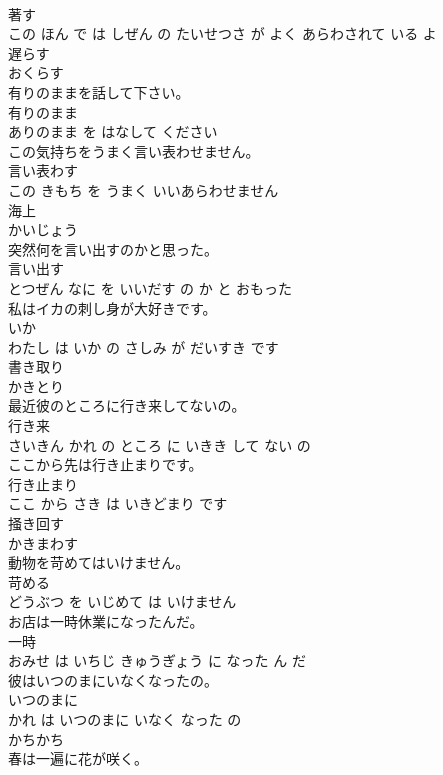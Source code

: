 \documentclass[8pt]{extreport}
\begin{document}
\begin{CJK}{UTF8}{min}
\\	著す 
\\	この ほん で は しぜん の たいせつさ が よく あらわされて いる よ			
\\	遅らす	
\\	おくらす			
\\	有りのままを話して下さい。	
\\	有りのまま 
\\	ありのまま を はなして ください			
\\	この気持ちをうまく言い表わせません。	
\\	言い表わす 
\\	この きもち を うまく いいあらわせません			
\\	海上	
\\	かいじょう			
\\	突然何を言い出すのかと思った。	
\\	言い出す 
\\	とつぜん なに を いいだす の か と おもった			
\\	私はイカの刺し身が大好きです。	
\\	いか 
\\	わたし は いか の さしみ が だいすき です			
\\	書き取り	
\\	かきとり			
\\	最近彼のところに行き来してないの。	
\\	行き来 
\\	さいきん かれ の ところ に いきき して ない の			
\\	ここから先は行き止まりです。	
\\	行き止まり 
\\	ここ から さき は いきどまり です			
\\	掻き回す	
\\	かきまわす			
\\	動物を苛めてはいけません。	
\\	苛める 
\\	どうぶつ を いじめて は いけません			
\\	お店は一時休業になったんだ。	
\\	一時 
\\	おみせ は いちじ きゅうぎょう に なった ん だ			
\\	彼はいつのまにいなくなったの。	
\\	いつのまに 
\\	かれ は いつのまに いなく なった の			
\\	かちかち	
\\	春は一遍に花が咲く。	

\end{CJK}
\end{document}
